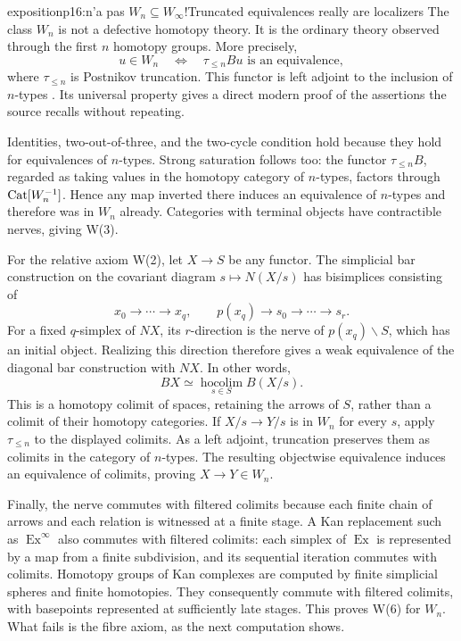 \begin{dcomment}{exposition}{p16:n'a pas $W_n \subseteq W_\infty$!}{Truncated equivalences really are localizers}
The class \(W_n\) is not a defective homotopy theory. It is the ordinary theory observed through the first \(n\) homotopy groups. More precisely,
\[
  u\in W_n\quad\Longleftrightarrow\quad
  \tau_{\leq n}Bu\text{ is an equivalence},
\]
where \(\tau_{\leq n}\) is Postnikov truncation. This functor is left adjoint to the inclusion of \(n\)-types \citep[Proposition~5.5.6.18]{Lurie2009HTT}. Its universal property gives a direct modern proof of the assertions the source recalls without repeating.

Identities, two-out-of-three, and the two-cycle condition hold because they hold for equivalences of \(n\)-types. Strong saturation follows too: the functor \(\tau_{\leq n}B\), regarded as taking values in the homotopy category of \(n\)-types, factors through \(\mathrm{Cat}[W_n^{-1}]\). Hence any map inverted there induces an equivalence of \(n\)-types and therefore was in \(W_n\) already. Categories with terminal objects have contractible nerves, giving W(3).

For the relative axiom W(2), let \(X\to S\) be any functor. The simplicial bar construction on the covariant diagram \(s\mapsto N(X/s)\) has bisimplices consisting of
\[
 x_0\to\cdots\to x_q,\qquad
 p(x_q)\to s_0\to\cdots\to s_r.
\]
For a fixed \(q\)-simplex of \(NX\), its \(r\)-direction is the nerve of \(p(x_q)\backslash S\), which has an initial object. Realizing this direction therefore gives a weak equivalence of the diagonal bar construction with \(NX\). In other words,
\[
 BX\simeq\operatorname*{hocolim}_{s\in S}B(X/s).
\]
This is a homotopy colimit of spaces, retaining the arrows of \(S\), rather than a colimit of their homotopy categories. If \(X/s\to Y/s\) is in \(W_n\) for every \(s\), apply \(\tau_{\leq n}\) to the displayed colimits. As a left adjoint, truncation preserves them as colimits in the category of \(n\)-types. The resulting objectwise equivalence induces an equivalence of colimits, proving \(X\to Y\in W_n\).

Finally, the nerve commutes with filtered colimits because each finite chain of arrows and each relation is witnessed at a finite stage. A Kan replacement such as \(\operatorname{Ex}^{\infty}\) also commutes with filtered colimits: each simplex of \(\operatorname{Ex}\) is represented by a map from a finite subdivision, and its sequential iteration commutes with colimits. Homotopy groups of Kan complexes are computed by finite simplicial spheres and finite homotopies. They consequently commute with filtered colimits, with basepoints represented at sufficiently late stages. This proves W(6) for \(W_n\). What fails is the fibre axiom, as the next computation shows.
\end{dcomment}


